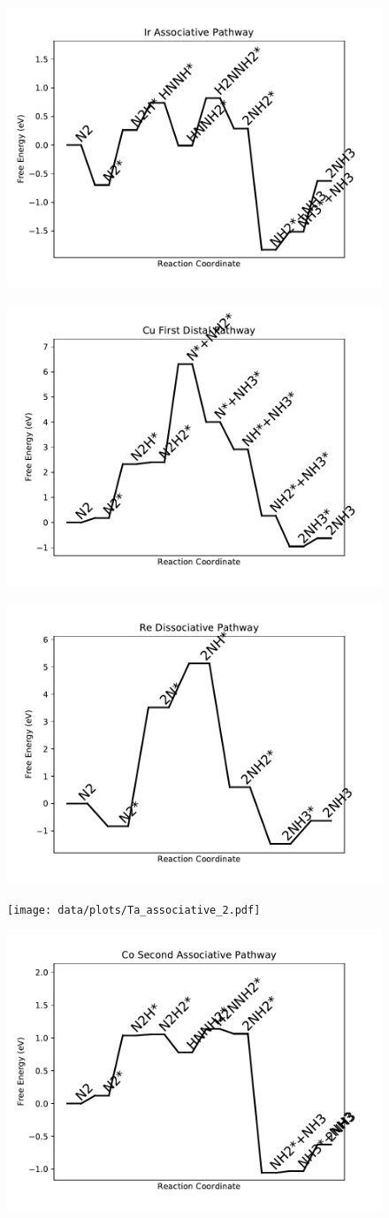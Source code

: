 \begin{figure}
\includegraphics[width=0.5\linewidth]{data/plots/Ir_associative.pdf}
\label{fig:Ir_associative}
\end{figure}

\begin{figure}
\includegraphics[width=0.5\linewidth]{data/plots/Cu_distal_1.pdf}
\label{fig:Cu_distal_1}
\end{figure}

\begin{figure}
\includegraphics[width=0.5\linewidth]{data/plots/Re_dissociative.pdf}
\label{fig:Re_dissociative}
\end{figure}

\begin{figure}
\texttt{[image: data/plots/Ta\_associative\_2.pdf]}
\label{fig:Ta_associative_2}
\end{figure}

\begin{figure}
\includegraphics[width=0.5\linewidth]{data/plots/Co_associative_2.pdf}
\label{fig:Co_associative_2}
\end{figure}

